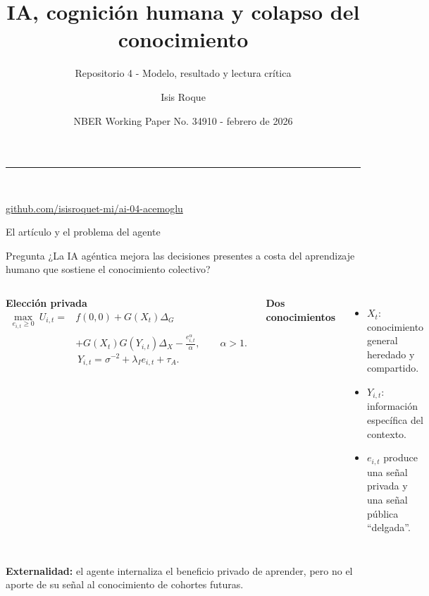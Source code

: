 \documentclas\documentclass[aspectratio=169,11pt]{beamer}
\title{IA, cognición humana y colapso del conocimiento}
\subtitle{Repositorio 4 - Modelo, resultado y lectura crítica}
\author{Isis Roque}
\date{NBER Working Paper No. 34910 - febrero de 2026}
\newcommand{\azul}[1]{\textcolor{AzulMedio}{\textbf{#1}}}
\newcommand{\repo}{\href{https://github.com/isisroquet-mi/ai-04-acemoglu}{github.com/isisroquet-mi/ai-04-acemoglu}}
\begin{document}
\begingroup
{}
\begin{frame}[plain]
  \vfill
  \hspace{0.65cm}\begin{minipage}{0.84\paperwidth}
    {\color{AzulClaro}\rule{1.6cm}{2pt}}\\[0.45cm]
    {\color{white}\inserttitle\par}
    \vspace{0.34cm}
    {\large\color{AzulHielo}\insertsubtitle\par}
    \vspace{0.85cm}
    {\normalsize\color{white}\insertauthor\par}
    {\small\color{AzulHielo}\insertdate\par}
    \vspace{0.45cm}
    {\small\color{AzulClaro}\repo}
  \end{minipage}
  \vfill
\end{frame}
\endgroup

\begin{frame}{El artículo y el problema del agente}
\begin{block}{Pregunta}
¿La IA agéntica mejora las decisiones presentes a costa del aprendizaje humano que sostiene el conocimiento colectivo?
\end{block}

\begin{columns}[T,onlytextwidth]
\azul{Elección privada}
{\small
\[
\begin{aligned}
\max_{e_{i,t}\ge 0}\ U_{i,t}
={}&f(0,0)+G(X_t)\Delta_G\\
&+G(X_t)G(Y_{i,t})\Delta_X-\frac{e_{i,t}^{\alpha}}{\alpha},
\qquad \alpha>1.
\end{aligned}
\]}
\[
Y_{i,t}=\sigma^{-2}+\lambda_I e_{i,t}+\tau_A.
\]

\azul{Dos conocimientos}
\begin{itemize}\small
  \item $X_t$: conocimiento general heredado y compartido.
  \item $Y_{i,t}$: información específica del contexto.
  \item $e_{i,t}$ produce una señal privada y una señal pública ``delgada''.
\end{itemize}
\end{columns}

\vspace{0.05cm}
{\small\color{Gris}\textbf{Externalidad:} el agente internaliza el beneficio privado de aprender, pero no el aporte de su señal al conocimiento de cohortes futuras.}
\end{frame}
\end{document}
